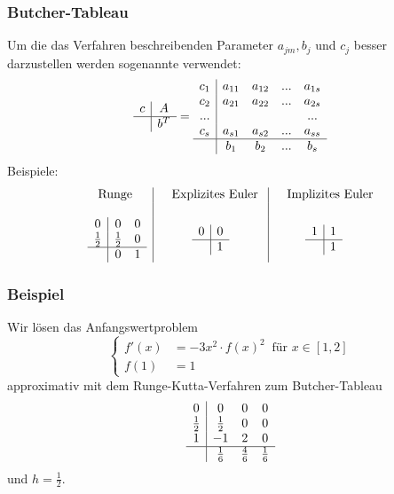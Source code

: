 \begin{frame}\frametitle{Butcher-Tableau}
Um die das Verfahren beschreibenden Parameter $a_{jm}, b_j$ und $c_j$ besser darzustellen werden sogenannte  verwendet:
$$
\begin{array}{c|c}
c&A\\ \hline & b^T
\end{array}=\begin{array}{c|cccc}
c_1&a_{11} & a_{12} & ... & a_{1s}\\
c_2&a_{21} & a_{22} & ... & a_{2s}\\
...&&&&...\\
c_s&a_{s1} & a_{s2} & ... & a_{ss}\\ \hline
&b_1 & b_2 & ... & b_s
\end{array}
$$\pause
Beispiele:
$$
\begin{array}{c|c|c}
\text{Runge  } &\quad \text{Explizites Euler  } &\quad \text{Implizites Euler}\\
&&\\
\begin{array}{c|cc}
0&0&0\\
\frac{1}{2}&\frac{1}{2}&0\\\hline
&0&1
\end{array}&
\begin{array}{c|c}
0&0\\\hline
&1
\end{array}&
\begin{array}{c|c}
1&1\\\hline
&1
\end{array}
\end{array}
$$
\end{frame}
%
\begin{frame}\frametitle{Beispiel}
Wir lösen das Anfangswertproblem
$$
\begin{cases}
f'(x)&=-3x^2 \cdot f(x)^2 \ \text{ für } x \in [1,2]\\
f(1)&=1
\end{cases}
$$
approximativ mit dem Runge-Kutta-Verfahren zum Butcher-Tableau
$$
\begin{array}{c|ccc}
0&0&0&0\\
\frac{1}{2}&\frac{1}{2}&0&0\\
1&-1&2&0\\\hline
&\frac{1}{6}&\frac{4}{6}&\frac{1}{6}
\end{array}
$$
und $h=\frac{1}{2}$.
\end{frame}
%
